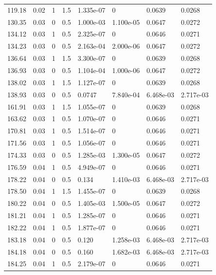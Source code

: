 \documentclass[preview]{standalone}
\begin{document}
{{\begin{tabular}{L{1.2cm}C{1.2cm} C{0.3cm}C{0.5cm} C{1.4cm}C{1.4cm} C{1.4cm}C{1.4cm}}
  119.18  &  0.02  & 1     & 1.5 &  1.335e-07  & 0  & 0.0639 &  0.0268   \\ 
  130.35  &  0.03  & 0     & 0.5 &  1.000e-03  & 1.100e-05  & 0.0647 &  0.0272   \\ 
  134.12  &  0.03  & 1     & 0.5 &  2.325e-07  & 0  & 0.0646 &  0.0271   \\ 
  134.23  &  0.03  & 0     & 0.5 &  2.163e-04  & 2.000e-06  & 0.0647 &  0.0272   \\ 
  136.64  &  0.03  & 1     & 1.5 &  3.300e-07  & 0  & 0.0639 &  0.0268   \\ 
  136.93  &  0.03  & 0     & 0.5 &  1.104e-04  & 1.000e-06  & 0.0647 &  0.0272   \\ 
  138.02  &  0.03  & 1     & 1.5 &  1.127e-07  & 0  & 0.0639 &  0.0268   \\ 
  138.93  &  0.03  & 0     & 0.5 &  0.0747  & 7.840e-04  & 6.468e-03 &  2.717e-03   \\ 
  161.91  &  0.03  & 1     & 1.5 &  1.055e-07  & 0  & 0.0639 &  0.0268   \\ 
  163.62  &  0.03  & 1     & 0.5 &  1.070e-07  & 0  & 0.0646 &  0.0271   \\ 
  170.81  &  0.03  & 1     & 0.5 &  1.514e-07  & 0  & 0.0646 &  0.0271   \\ 
  171.56  &  0.03  & 1     & 0.5 &  1.056e-07  & 0  & 0.0646 &  0.0271   \\ 
  174.33  &  0.03  & 0     & 0.5 &  1.285e-03  & 1.300e-05  & 0.0647 &  0.0272   \\ 
  176.59  &  0.04  & 1     & 0.5 &  4.949e-07  & 0  & 0.0646 &  0.0271   \\ 
  178.22  &  0.04  & 0     & 0.5 &  0.134  & 1.410e-03  & 6.468e-03 &  2.717e-03   \\ 
  178.50  &  0.04  & 1     & 1.5 &  1.455e-07  & 0  & 0.0639 &  0.0268   \\ 
  180.22  &  0.04  & 0     & 0.5 &  1.405e-03  & 1.500e-05  & 0.0647 &  0.0272   \\ 
  181.21  &  0.04  & 1     & 0.5 &  1.285e-07  & 0  & 0.0646 &  0.0271   \\ 
  182.22  &  0.04  & 1     & 0.5 &  1.877e-07  & 0  & 0.0646 &  0.0271   \\ 
  183.18  &  0.04  & 0     & 0.5 &  0.120  & 1.258e-03  & 6.468e-03 &  2.717e-03   \\ 
  184.18  &  0.04  & 0     & 0.5 &  0.160  & 1.682e-03  & 6.468e-03 &  2.717e-03   \\ 
  184.25  &  0.04  & 1     & 0.5 &  2.179e-07  & 0  & 0.0646 &  0.0271   \\ 

\end{tabular}}}
\end{document}
